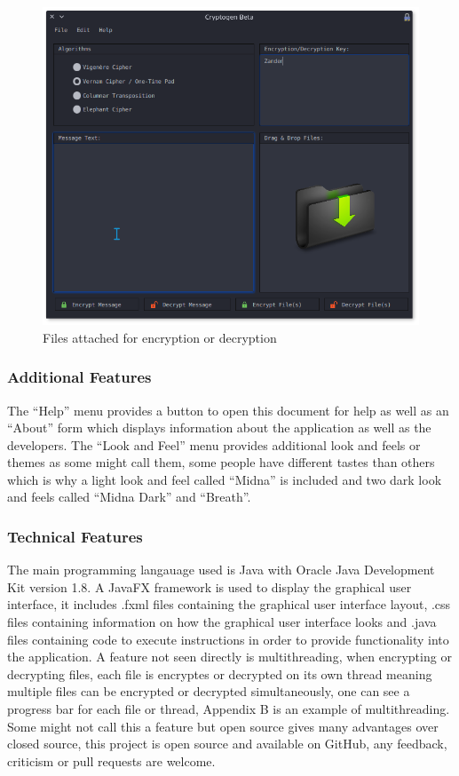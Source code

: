 \documentclass[11pt]{article}
\begin{document}
	\begin{figure}[!htb]
	\centering
	\includegraphics[scale=0.55]{files.png}
	\caption{Files attached for encryption or decryption} %
	\label{fig:files} %
	\end{figure}

\newpage
	\subsubsection{Additional Features}
	The ``Help'' menu provides a button to open this document for help as well as an ``About'' form which displays information about the application as well as the developers. The ``Look and Feel'' menu provides additional look and feels or themes as some might call them, some people have different tastes than others which is why a light look and feel called ``Midna'' is included and two dark look and feels called ``Midna Dark'' and ``Breath''.

	\subsubsection{Technical Features}
	The main programming langauage used is Java with Oracle Java Development Kit version 1.8. A JavaFX framework is used to display the graphical user interface, it includes .fxml files containing the graphical user interface layout, .css files containing information on how the graphical user interface looks and .java files containing code to execute instructions in order to provide functionality into the application. A feature not seen directly is multithreading, when encrypting or decrypting files, each file is encryptes or decrypted on its own thread meaning multiple files can be encrypted or decrypted simultaneously, one can see a progress bar for each file or thread, Appendix B is an example of multithreading. Some might not call this a feature but open source gives many advantages over closed source, this project is open source and available on GitHub, any feedback, criticism or pull requests are welcome.
\end{document}
